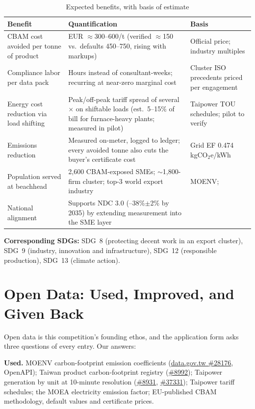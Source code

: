 \begin{table}[htbp]
\caption{Expected benefits, with basis of estimate}
\label{tab:benefits}
\small
\begin{tabularx}{\textwidth}{@{}p{}Xp{}@{}}
\toprule
\textbf{Benefit} & \textbf{Quantification} & \textbf{Basis} \\
\midrule
CBAM cost avoided per tonne of product & EUR $\approx$300--600/t (verified $\approx$150 vs.\ defaults 450--750, rising with markups) & Official price\cite{ecprice}; industry multiples\cite{specialinsert} \\
Compliance labor per data pack & Hours instead of consultant-weeks; recurring at near-zero marginal cost & Cluster ISO precedents priced per engagement\cite{chanchin} \\
Energy cost reduction via load shifting & Peak/off-peak tariff spread of several$\times$ on shiftable loads (est.\ 5--15\% of bill for furnace-heavy plants; measured in pilot) & Taipower TOU schedules\cite{taipower}; pilot to verify \\
Emissions reduction & Measured on-meter, logged to ledger; every avoided tonne also cuts the buyer's certificate cost & Grid EF 0.474 kgCO$_2$e/kWh\cite{moeaea} \\
Population served at beachhead & 2,600 CBAM-exposed SMEs; $\sim$1,800-firm cluster; top-3 world export industry & MOENV\cite{tpt-cbam}; \cite{goebel,ktimes} \\
National alignment & Supports NDC 3.0 (--38\%$\pm$2\% by 2035) by extending measurement into the SME layer & \cite{ndc} \\
\bottomrule
\end{tabularx}
\end{table}

\textbf{Corresponding SDGs:} SDG~8 (protecting decent work in an export
cluster), SDG~9 (industry, innovation and infrastructure), SDG~12 (responsible
production), SDG~13 (climate action).

\section{Open Data: Used, Improved, and Given Back}\label{sec:opendata}

Open data is this competition's founding ethos, and the application form asks
three questions of every entry\cite{handbook}. Our answers:

\textbf{Used.} MOENV carbon-footprint emission coefficients
(\href{https://data.gov.tw/en/datasets/28176}{data.gov.tw \#28176}, OpenAPI);
Taiwan product carbon-footprint registry
(\href{https://data.gov.tw/en/datasets/8992}{\#8992}); Taipower generation by
unit at 10-minute resolution
(\href{https://data.gov.tw/en/datasets/8931}{\#8931},
\href{https://data.gov.tw/en/datasets/37331}{\#37331}); Taipower tariff
schedules\cite{taipower}; the MOEA electricity emission factor\cite{moeaea};
EU-published CBAM methodology, default values and certificate
prices\cite{taxud,ecprice}.

